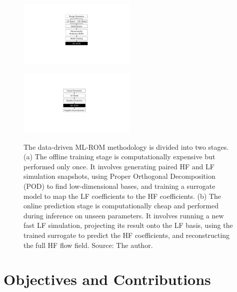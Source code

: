 \documentclass[tg, EN]{ufabcFHZh_tg}
\begin{document}
\begin{figure}[H]
    \centering
    \begin{minipage}[c]{0.48\textwidth}
        \centering
        \includegraphics[width=0.5\textwidth]{Figuras/rom_pipeline_a.pdf}
        \label{fig:rom_methodology_a}
    \end{minipage}
    \hfill
    \begin{minipage}[c]{0.48\textwidth}
        \centering
        \includegraphics[width=0.5\textwidth]{Figuras/rom_pipeline_b.pdf}
        \label{fig:rom_methodology_b}
    \end{minipage}
    \caption{The data-driven ML-ROM methodology is divided into two stages. (a) The offline training stage is computationally expensive but performed only once. It involves generating paired HF and LF simulation snapshots, using Proper Orthogonal Decomposition (POD) to find low-dimensional bases, and training a surrogate model to map the LF coefficients to the HF coefficients. (b) The online prediction stage is computationally cheap and performed during inference on unseen parameters. It involves running a new fast LF simulation, projecting its result onto the LF basis, using the trained surrogate to predict the HF coefficients, and reconstructing the full HF flow field. Source: The author.}
    \label{fig:rom_methodology}
    \end{figure}

\section{Objectives and Contributions}
\end{document}
